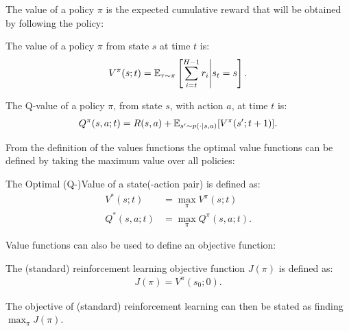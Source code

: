     The value of a policy $\pi$ is the expected cumulative reward that will be obtained by following the policy:
    \begin{defn}
        \label{def:2:value}
        \label{def:2:q_value}
        The \textnormal{value} of a policy $\pi$ from state $s$ at time $t$ is:
        \begin{align}
            V^{\pi}(s;t) = \mathbb{E}_{\tau\sim\pi}\left[\sum_{i=t}^{H-1} r_i \Bigg| s_t=s \right]. \label{eq:2:value_fn_def}
        \end{align} 

        The \textnormal{Q-value} of a policy $\pi$, from state $s$, with action $a$, at time $t$ is:
        \begin{align}
            Q^{\pi}(s,a;t) = R(s,a) + \mathbb{E}_{s'\sim p(\cdot|s,a)} [V^{\pi}(s';t+1)]. \label{eq:2:q_value_fn_def}
        \end{align} 
    \end{defn}

    From the definition of the values functions the optimal value functions can be defined by taking the maximum value over all policies:
    \begin{defn}
        \label{def:2:optimal_value}
        \label{def:2:optimal_q_value}
        The \textnormal{Optimal (Q-)Value} of a state(-action pair) is defined as:
        \begin{align}
            V^*(s;t) &= \max_{\pi} V^{\pi}(s;t) \label{eq:2:opt_value_fn_def} \\
            Q^*(s,a;t) &= \max_{\pi} Q^{\pi}(s,a;t). \label{eq:2:opt_q_value_fn_def}
        \end{align}
    \end{defn}

    Value functions can also be used to define an objective function:
    \begin{defn}
        \label{def:2:rl_obj_fn}
        The \textnormal{(standard) reinforcement learning objective function} $J(\pi)$ is defined as:
        \begin{align}
            J(\pi) = V^{\pi}(s_0;0). \label{eq:2:rl_obj_fn_def}
        \end{align}

        The objective of (standard) reinforcement learning can then be stated as finding $\max_{\pi} J(\pi)$.
    \end{defn}

